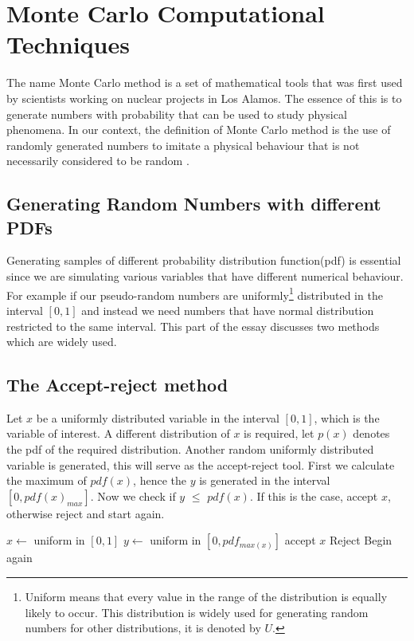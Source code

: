 \chapter{Monte Carlo Computational Techniques}

The name Monte Carlo method is a set of mathematical tools that was first used by scientists working on nuclear projects in Los Alamos. The essence of this is to generate numbers with probability that can be used to study physical phenomena. In our context, the definition of Monte Carlo method is the use of randomly generated numbers to imitate a physical behaviour that is not necessarily considered to be random \citep{montecarlo}.

\section{Generating Random Numbers with different PDFs}

Generating samples of different probability distribution function(pdf) is essential since we are simulating various variables that have different numerical behaviour. For example if our pseudo-random numbers are uniformly\footnote{Uniform means that every value in the range of the distribution is equally likely to occur. This distribution is widely used for generating random numbers for other distributions, it is denoted by $U$.} distributed in the interval $[0,1]$  and instead we need numbers that have normal distribution restricted to the same interval. This part of the essay  discusses two methods which are widely used.

\section{The Accept-reject method}
Let $x$ be a uniformly distributed variable in the interval $[0,1]$, which is the variable of interest. A different distribution of $x$ is required, let $p(x)$ denotes the pdf of the required distribution. Another  random uniformly distributed variable is generated, this will serve as the accept-reject tool. First we calculate the maximum of $pdf(x)$, hence the $y$ is generated in the interval $[0,pdf(x)_{max}]$. Now we check if $y$ $\leq$ $pdf(x)$. If this is the case, accept $x$, otherwise reject and start again. 
\begin{algorithmic} 
\State $x \gets$ uniform in $[0, 1]$
\State $y \gets$ uniform in $[0, pdf_{max(x)}]$
    \State accept $x$
\Else 
	\State Reject 
\EndIf
\State Begin again
\end{algorithmic}
% 

